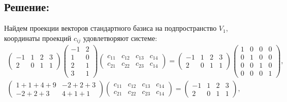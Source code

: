 \documentclass[12pt]{article}
\begin{document}
    \subsection*{Решение:}
    Найдем проекции векторов стандартного базиса на подпространство $V_1$, координаты проекций $c_{ij}$ удовлетворяют системе:
    \begin{gather*}
        \begin{pmatrix}
            -1 & 1 & 2 & 3 \\
            2  & 0 & 1 & 1
        \end{pmatrix}
        \begin{pmatrix}
            -1 & 2 \\
            1  & 0 \\
            2  & 1 \\
            3  & 1
        \end{pmatrix}
        \begin{pmatrix}
            c_{11} & c_{12} & c_{13} & c_{14} \\
            c_{21} & c_{22} & c_{23} & c_{14}
        \end{pmatrix}
        =
        \begin{pmatrix}
            -1 & 1 & 2 & 3 \\
            2  & 0 & 1 & 1
        \end{pmatrix}
        \begin{pmatrix}
            1 & 0 & 0 & 0 \\
            0 & 1 & 0 & 0 \\
            0 & 0 & 1 & 0 \\
            0 & 0 & 0 & 1
        \end{pmatrix} , \\
        \begin{pmatrix}
            1 + 1 + 4 + 9 & -2 + 2 + 3 \\
            -2 + 2 + 3    & 4 + 1 + 1
        \end{pmatrix}
        \begin{pmatrix}
            c_{11} & c_{12} & c_{13} & c_{14} \\
            c_{21} & c_{22} & c_{23} & c_{14}
        \end{pmatrix}
        =
        \begin{pmatrix}
            -1 & 1 & 2 & 3 \\
            2  & 0 & 1 & 1
        \end{pmatrix} , \\

\end{gather*}
\end{document}
